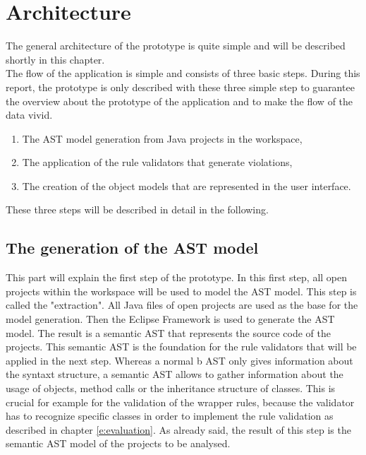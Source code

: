 \section{Architecture}
\label{p:architecture}
The general architecture of the prototype is quite simple and will be described shortly in this chapter. 
\\

The flow of the application is simple and consists of three basic steps. During this report, the prototype is only described with these three simple step to guarantee the overview about the prototype of the application and to make the flow of the data vivid.

\begin{enumerate}
  \item The \acf{AST} model generation from Java projects in the workspace,
  \item The application of the rule validators that generate violations,
  \item The creation of the object models that are represented in the user interface. 
\end{enumerate}

These three steps will be described in detail in the following. 

\subsection{The generation of the AST model}
This part will explain the first step of the prototype. In this first step, all open projects within the workspace will be used to model the \acf{AST} model. This step is called the "extraction". All Java files of open projects are used as the base for the model generation. Then the Eclipse Framework is used to generate the  \acf{AST} model. The result is a semantic \acf{AST} that represents the source code of the projects. This semantic \acf{AST}  is the foundation for the rule validators that will be applied in the next step. Whereas a normal b \acf{AST} only gives information about the syntaxt structure, a semantic \acf{AST} allows to gather information about the usage of objects, method calls or the inheritance structure of classes. This is crucial for example for the validation of the wrapper rules, because the validator has to recognize specific classes in order to implement the rule validation as described in chapter \ref{e:evaluation}. As already said, the result of this step is the semantic \acf{AST} model of the projects to be analysed. 

